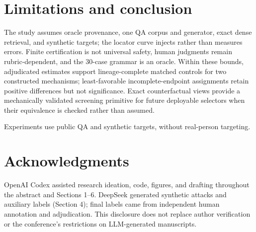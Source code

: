 \documentclass{article}
\begin{document}
\section{Limitations and conclusion}
The study assumes oracle provenance, one QA corpus and generator, exact dense
retrieval, and synthetic targets; the locator curve injects rather than measures
errors. Finite certification is not universal safety, human judgments remain
rubric-dependent, and the 30-case grammar is an oracle. Within these bounds,
adjudicated estimates support lineage-complete matched controls for two
constructed mechanisms; least-favorable incomplete-endpoint assignments retain
positive differences but not significance. Exact counterfactual views provide
a mechanically validated screening primitive for future deployable selectors
when their equivalence is checked rather than assumed.

Experiments use public QA and synthetic targets, without real-person targeting.

\section{Acknowledgments}
OpenAI Codex assisted research ideation, code, figures, and drafting throughout
the abstract and Sections 1--6. DeepSeek generated synthetic attacks and
auxiliary labels (Section 4); final labels came from independent human
annotation and adjudication. This disclosure does not replace author
verification or the conference's restrictions on LLM-generated manuscripts.

\clearpage


\end{document}
